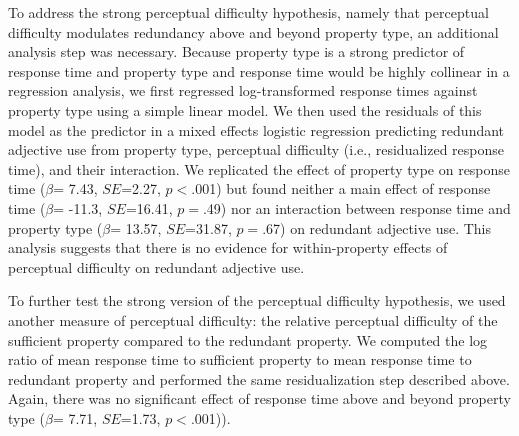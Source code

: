 \documentclass[12pt,letterpaper]{article}
\begin{document}
To address the strong perceptual difficulty hypothesis, namely that perceptual difficulty modulates redundancy above and beyond property type, an additional analysis step was necessary. Because property type is a strong predictor of response time and property type and response time would be highly collinear in a regression analysis, we first regressed log-transformed response times against property type using a simple linear model. %
We then used the residuals of this model as the predictor in a mixed effects logistic regression predicting redundant adjective use from property type, perceptual difficulty (i.e., residualized response time), and their interaction. We replicated the effect of property type on response time ($\beta$= 7.43, $SE$=2.27, $p$$<$.001) but found neither a main effect of response time ($\beta$= -11.3, $SE$=16.41, $p$$=$.49) nor an interaction between response time and property type ($\beta$= 13.57, $SE$=31.87, $p$$=$.67) on redundant adjective use. This analysis suggests that there is no evidence for within-property effects of perceptual difficulty on redundant adjective use.

To further test the strong version of the perceptual difficulty hypothesis, we used another measure of perceptual difficulty: the relative perceptual difficulty of the sufficient property compared to the redundant property. We computed the log ratio of mean response time to sufficient property to mean response time to redundant property and performed the same residualization step described above. Again, there was no significant effect of response time above and beyond property type ($\beta$= 7.71, $SE$=1.73, $p$$<$.001)).
\end{document}
